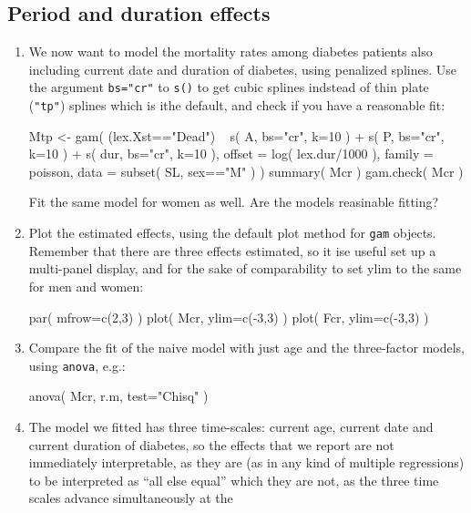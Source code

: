 \subsection*{Period and duration effects}
\begin{enumerate}[resume]
\item We now want to model the mortality rates among diabetes patients
  also including current date and duration of diabetes, using penalized
  splines.  Use the argument \texttt{bs="cr"} to \texttt{s()} to get
  cubic splines indstead of thin plate (\texttt{"tp"}) splines which is
  ithe default, and check if you have a reasonable fit:
\begin{Schunk}
\begin{Sinput}
 Mtp <- gam( (lex.Xst=="Dead") ~ s(   A, bs="cr", k=10 ) +
                                 s(   P, bs="cr", k=10 ) +
                                 s( dur, bs="cr", k=10 ),
             offset = log( lex.dur/1000 ),
             family = poisson,
               data = subset( SL, sex=="M" ) )
 summary( Mcr )
 gam.check( Mcr )
\end{Sinput}
\end{Schunk}
Fit the same model for women as well. Are the models reasinable fitting?
\item Plot the estimated effects, using the default plot method for
  \texttt{gam} objects. Remember that there are three effects
  estimated, so it ise useful set up a multi-panel display, and for
  the sake of comparability to set ylim to the same for men and women:
\begin{Schunk}
\begin{Sinput}
 par( mfrow=c(2,3) )
 plot( Mcr, ylim=c(-3,3) )
 plot( Fcr, ylim=c(-3,3) )
\end{Sinput}
\end{Schunk}
\item Compare the fit of the naive model with just age and the
  three-factor models, using \texttt{anova}, e.g.:
\begin{Schunk}
\begin{Sinput}
 anova( Mcr, r.m, test="Chisq" )
\end{Sinput}
\end{Schunk}
\item The model we fitted has three time-scales: current age, current
  date and current duration of diabetes, so the effects that we report
  are not immediately interpretable, as they are (as in any kind of
  multiple regressions) to be interpreted as ``all else equal'' which
  they are not, as the three time scales advance simultaneously at the

\end{enumerate}
